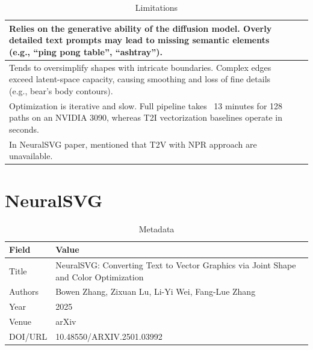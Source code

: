     \begin{table}[h!]
    \centering
    \caption{Limitations}
    \begin{tabular}{|p{4.8cm}|p{5.2cm}|p{5.2cm}|}
    \hline

    Relies on the generative ability of the diffusion model. Overly detailed text prompts may lead to missing semantic elements (e.g., “ping pong table”, “ashtray”). \\ \hline

    Tends to oversimplify shapes with intricate boundaries. Complex edges exceed latent-space capacity, causing smoothing and loss of fine details (e.g., bear’s body contours). \\ \hline

    Optimization is iterative and slow. Full pipeline takes ~13 minutes for 128 paths on an NVIDIA 3090, whereas T2I vectorization baselines operate in seconds. \\ \hline

    In NeuralSVG paper, mentioned that T2V with NPR approach are unavailable. 
    \end{tabular}
    \end{table}










    \chapter{NeuralSVG}

    \begin{table}[h!]
    \centering
    \caption{Metadata}
    \begin{tabular}{|l|l|}
    \hline
    \textbf{Field} & \textbf{Value} \\ \hline
    Title & NeuralSVG: Converting Text to Vector Graphics via Joint Shape and Color Optimization \\ \hline
    Authors & Bowen Zhang, Zixuan Lu, Li-Yi Wei, Fang-Lue Zhang \\ \hline
    Year & 2025 \\ \hline
    Venue & arXiv  \\ \hline
    DOI/URL & 10.48550/ARXIV.2501.03992 \\ \hline
    \end{tabular}
    \end{table}


